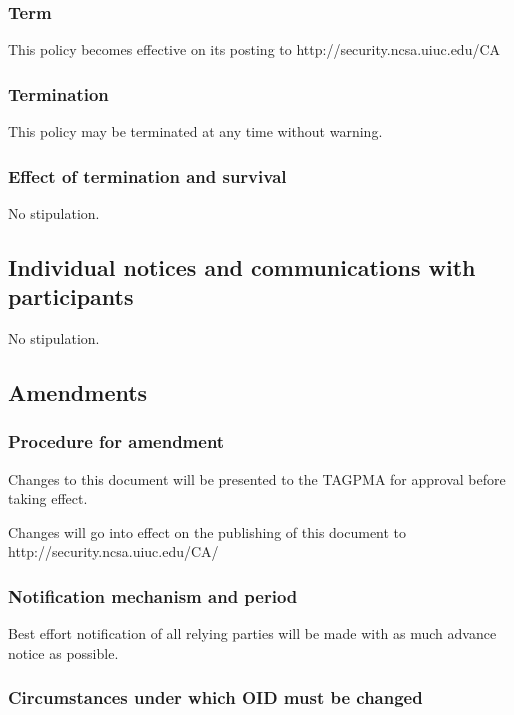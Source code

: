 \documentclass[10pt]{article}
\begin{document}
\subsubsection{Term}

This policy becomes effective on its posting to
http://security.ncsa.uiuc.edu/CA

\subsubsection{Termination}

This policy may be terminated at any time without warning.

\subsubsection{Effect of termination and survival}

No stipulation.

\subsection{Individual notices and communications with participants}

No stipulation.

\subsection{Amendments}
\subsubsection{Procedure for amendment}

Changes to this document will be presented to the TAGPMA for approval
before taking effect.

Changes will go into effect on the publishing of this document to
http://security.ncsa.uiuc.edu/CA/

\subsubsection{Notification mechanism and period}

Best effort notification of all relying parties will be made with as
much advance notice as possible.

\subsubsection{Circumstances under which OID must be changed}
\end{document}
